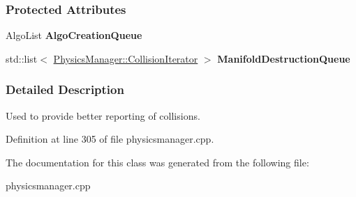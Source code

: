 \subsubsection*{Protected Attributes}
\begin{DoxyCompactItemize}
\item 
\hypertarget{classMezzanine_1_1CollisionDispatcher_a124864848dcdbf42a92b45b3cca2137e}{
AlgoList {\bfseries AlgoCreationQueue}}
\label{classMezzanine_1_1CollisionDispatcher_a124864848dcdbf42a92b45b3cca2137e}

\item 
\hypertarget{classMezzanine_1_1CollisionDispatcher_abec245f674a643a070fb7b87f96cfc79}{
std::list$<$ \hyperlink{classMezzanine_1_1PhysicsManager_a930a032df1bf01b9f93ba4e815a433c2}{PhysicsManager::CollisionIterator} $>$ {\bfseries ManifoldDestructionQueue}}
\label{classMezzanine_1_1CollisionDispatcher_abec245f674a643a070fb7b87f96cfc79}

\end{DoxyCompactItemize}


\subsubsection{Detailed Description}
Used to provide better reporting of collisions. 

Definition at line 305 of file physicsmanager.cpp.



The documentation for this class was generated from the following file:\begin{DoxyCompactItemize}
\item 
physicsmanager.cpp\end{DoxyCompactItemize}
